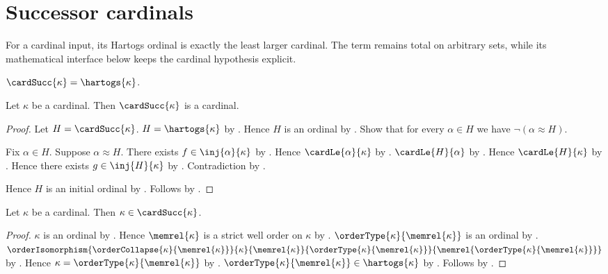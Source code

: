 \section{Successor cardinals}



For a cardinal input, its Hartogs ordinal is exactly the least larger
cardinal.  The term remains total on arbitrary sets, while its mathematical
interface below keeps the cardinal hypothesis explicit.

\begin{definition}\label{cardinal_successor}
    $\cardSucc{\kappa}=\hartogs{\kappa}$.
\end{definition}

\begin{theorem}\label{cardinal_successor_is_cardinal}
    Let $\kappa$ be a cardinal.
    Then $\cardSucc{\kappa}$ is a cardinal.
\end{theorem}
\begin{proof}
    Let $H=\cardSucc{\kappa}$.
    $H=\hartogs{\kappa}$ by .
    Hence $H$ is an ordinal by .
    Show that for every $\alpha\in H$ we have
        $\lnot(\alpha\approx H)$.
    \begin{subproof}
        Fix $\alpha\in H$.
        Suppose $\alpha\approx H$.
        There exists $f\in\inj{\alpha}{\kappa}$
            by .
        Hence $\cardLe{\alpha}{\kappa}$ by .
        $\cardLe{H}{\alpha}$
            by .
        Hence $\cardLe{H}{\kappa}$
            by .
        Hence there exists $g\in\inj{H}{\kappa}$
            by .
        Contradiction by .
    \end{subproof}
    Hence $H$ is an initial ordinal by .
    Follows by .
\end{proof}

\begin{proposition}\label{cardinal_belongs_to_successor}
    Let $\kappa$ be a cardinal.
    Then $\kappa\in\cardSucc{\kappa}$.
\end{proposition}
\begin{proof}
    $\kappa$ is an ordinal by .
    Hence $\memrel{\kappa}$ is a strict well order on $\kappa$
        by .
    $\orderType{\kappa}{\memrel{\kappa}}$ is an ordinal
        by .
    $\orderIsomorphism{\orderCollapse{\kappa}{\memrel{\kappa}}}
        {\kappa}{\memrel{\kappa}}
        {\orderType{\kappa}{\memrel{\kappa}}}
        {\memrel{\orderType{\kappa}{\memrel{\kappa}}}}$
        by .
    Hence $\kappa=\orderType{\kappa}{\memrel{\kappa}}$
        by .
    $\orderType{\kappa}{\memrel{\kappa}}\in\hartogs{\kappa}$
        by .
    Follows by .
\end{proof}

